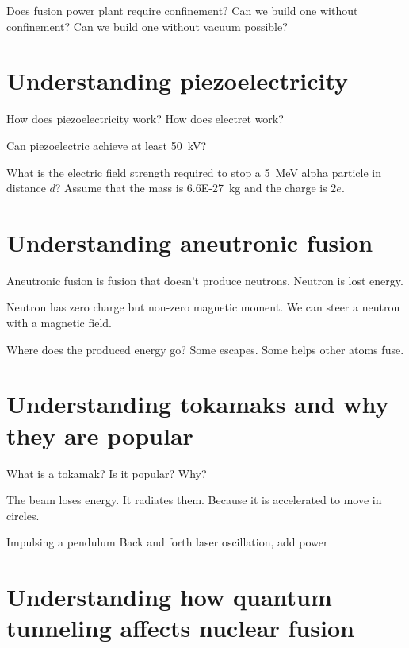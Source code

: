 Does fusion power plant require confinement?
Can we build one without confinement?
Can we build one without vacuum possible?

\section{Understanding piezoelectricity}

How does piezoelectricity work?
How does electret work?

Can piezoelectric achieve at least \SI{50}{kV}?

What is the electric field strength required to stop a \SI{5}{MeV} alpha particle in distance \(d\)?
Assume that the mass is \SI{6.6E-27}{kg} and the charge is \(2e\).

\section{Understanding aneutronic fusion}

Aneutronic fusion is fusion that doesn't produce neutrons.
Neutron is lost energy.

Neutron has zero charge but non-zero magnetic moment.
We can steer a neutron with a magnetic field.



Where does the produced energy go?
Some escapes.
Some helps other atoms fuse.

\section{Understanding tokamaks and why they are popular}

What is a tokamak?
Is it popular?
Why?

The beam loses energy.
It radiates them.
Because it is accelerated to move in circles.

Impulsing a pendulum
Back and forth laser oscillation, add power

\section{Understanding how quantum tunneling affects nuclear fusion}


